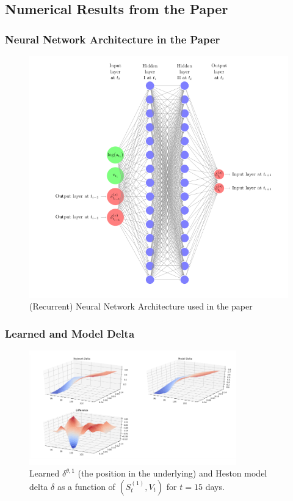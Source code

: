 \documentclass[serif]{beamer}
\begin{document}
\subsection{Numerical Results from the Paper}

\begin{frame}
    \frametitle{Neural Network Architecture in the Paper}
    \begin{figure}
        \includegraphics[height=0.7\textheight]{./images/neural_net_screenshot.png}
        \caption{
            (Recurrent) Neural Network Architecture used in the paper
        }
    \end{figure}
\end{frame}

\begin{frame}
    \frametitle{Learned and Model Delta}
    \begin{figure}
        \includegraphics[width=0.8\textwidth]{./images/model_delta_screenshot.png}
        \caption{
            Learned $\delta^{\theta, 1}$ (the position in the underlying)
            and Heston model delta $\delta$
            as a function of $(S^{(1)}_t, V_t)$ for $t=15$ days.
        }
    \end{figure}
\end{frame}
\end{document}
